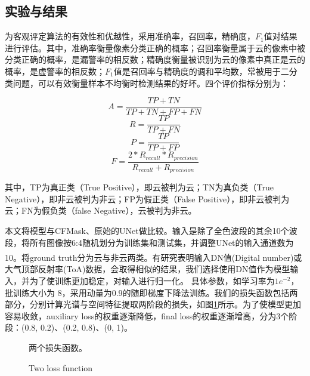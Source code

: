 \documentclass[10pt]{ctexart}
\newcommand{\upcite}[1]{\textsuperscript{\textsuperscript{\cite{#1}}}}
\begin{document}
\begin{multicols}{2}
\section[]{实验与结果}

为客观评定算法的有效性和优越性，采用准确率，召回率，精确度，$F_1$值对结果进行评估。其中，准确率衡量像素分类正确的概率；召回率衡量属于云的像素中被分类正确的概率，是漏警率的相反数；精确度衡量被识别为云的像素中真正是云的概率，是虚警率的相反数；$F_1$值是召回率与精确度的调和平均数，常被用于二分类问题，可以有效衡量样本不均衡时检测结果的好坏。四个评价指标分别为：

\begin{equation}
    A = \frac{TP + TN}{TP + TN + FP + FN}\label{acc}
\end{equation}
\begin{equation}
    R = \frac{TP}{TP + FN}\label{recall}
\end{equation}
\begin{equation}
    P = \frac{TP}{TP + FP}\label{precision}
\end{equation}
\begin{equation}
    F = \frac{2 * R_{recall} * R_{precision}}{R_{recall} + R_{precision}}\label{f1}
\end{equation}

其中，TP为真正类（True Positive），即云被判为云；TN为真负类（True Negative），即非云被判为非云；FP为假正类（False Positive），即非云被判为云；FN为假负类（false Negative），云被判为非云。

本文将模型与CFMask、原始的UNet做比较。输入是除了全色波段的其余10个波段，将所有图像按6:4随机划分为训练集和测试集，并调整UNet的输入通道数为10。将ground truth分为云与非云两类。有研究表明\upcite{chai2019cloud}输入DN值(Digital number)或大气顶部反射率(ToA)数据，会取得相似的结果，我们选择使用DN值作为模型输入，并为了使训练更加稳定，对输入进行归一化。
具体参数，如学习率为$1e^{-2}$，批训练大小为 8，采用动量为0.9的随即梯度下降法训练。我们的损失函数包括两部分，分别计算光谱与空间特征提取两阶段的损失，如图\ref{pic:loss}所示。为了使模型更加容易收敛，auxiliary loss的权重逐渐降低，final loss的权重逐渐增高，分为3个阶段：(0.8, 0.2)、(0.2, 0.8)、(0, 1)。

\begin{figure}[H]
    \centering
    \caption[]{两个损失函数。}
    \addtocounter{figure}{-1}
    \vspace{-5pt}
    \renewcommand{\figurename}{Fig}
    \caption{Two loss function}
    \renewcommand{\figurename}{图}
    \label{pic:loss}
\end{figure}


\end{multicols}
\end{document}
